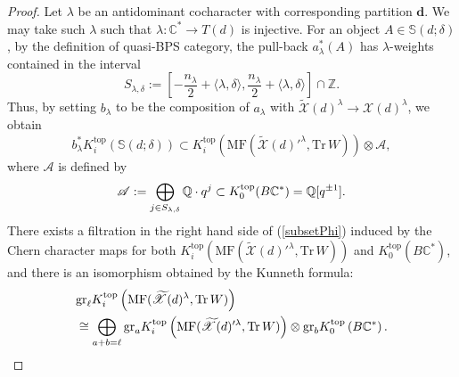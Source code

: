 \documentclass [11pt,oneside,a4paper,mathscr]{amsart}
\theoremstyle{definition}
\newcommand{\X}{\mathscr{X}}
\begin{document}
\begin{proof}
Let $\lambda$ be an antidominant cocharacter with corresponding 
partition $\mathbf{d}$. We may take such $\lambda$ such
that $\lambda \colon \mathbb{C}^{\ast} \to T(d)$ is injective. 
For an object $A \in \mathbb{S}(d; \delta)$, 
by the definition of quasi-BPS category, the pull-back $a_\lambda^*(A)$
has $\lambda$-weights contained in the interval
\[S_{\lambda, \delta}:=
\left[-\frac{n_{\lambda}}{2}+\langle \lambda,\delta\rangle, \frac{n_{\lambda}}{2}+\langle \lambda,\delta\rangle\right]\cap \mathbb{Z}.\]
Thus, by setting $b_{\lambda}$
to be the composition of $a_{\lambda}$ with 
$\widetilde{\X}(d)^{\lambda} \to \X(d)^{\lambda}$, we obtain 
\begin{equation}\label{subsetPhi}
    b^*_\lambda K^{\mathrm{top}}_i\left(\mathbb{S}(d; \delta)\right)\subset K^{\mathrm{top}}_i\left(\mathrm{MF}\left(\widetilde{\X}(d)'^{\lambda}, \mathrm{Tr}\,W\right)\right)\otimes
\mathscr{A},
\end{equation}
where 
$\mathscr{A}$ is defined by 
\begin{align*}
\mathscr{A}:=\bigoplus_{j\in S_{\lambda, \delta}}\mathbb{Q} \cdot q^j
\subset K_0^{\rm{top}}(B\mathbb{C}^{\ast})=\mathbb{Q}[q^{\pm 1}]. 
\end{align*}
There 
exists a filtration in the right hand side 
of (\ref{subsetPhi})
induced by the Chern character maps for both $K_i^{\mathrm{top}}\left(\mathrm{MF}(\widetilde{\X}(d)'^\lambda, \mathrm{Tr}\,W)\right)$ and $K_0^{\mathrm{top}}\left(B\mathbb{C}^*\right)$, and there is an isomorphism obtained by the Kunneth formula:
\begin{align}\label{kunnethgr}
&\mathrm{gr}_\ell K_i^{\mathrm{top}}\left(\mathrm{MF}(\widetilde{\X}(d)^\lambda, \mathrm{Tr}\,W)\right)\\
&\notag\cong \bigoplus_{a+b=\ell}\mathrm{gr}_a K_i^{\mathrm{top}}\left(\mathrm{MF}(\widetilde{\X}(d)'^\lambda, \mathrm{Tr}\,W)\right)\otimes \mathrm{gr}_b K_0^{\mathrm{top}}\left(B\mathbb{C}^*\right).
\end{align}


\end{proof}
\end{document}
